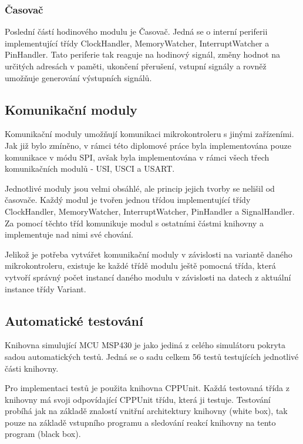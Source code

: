 \subsubsection{Časovač}

Poslední částí hodinového modulu je Časovač. Jedná se o interní periferii implementující třídy ClockHandler, MemoryWatcher, InterruptWatcher a PinHandler. Tato periferie tak reaguje na hodinový signál, změny hodnot na určitých adresách v paměti, ukončení přerušení, vstupní signály a rovněž umožňuje generování výstupních signálů.


\subsection{Komunikační moduly}

Komunikační moduly umožňují komunikaci mikrokontroleru s jinými zařízeními. Jak již bylo zmíněno, v rámci této diplomové práce byla implementována pouze komunikace v módu SPI, avšak byla implementována v rámci všech třech komunikačních modulů - USI, USCI a USART.

Jednotlivé moduly jsou velmi obsáhlé, ale princip jejich tvorby se nelišil od časovače. Každý modul je tvořen jednou třídou implementující třídy ClockHandler, MemoryWatcher, InterruptWatcher, PinHandler a SignalHandler. Za pomocí těchto tříd komunikuje modul s ostatními částmi knihovny a implementuje nad nimi své chování.

Jelikož je potřeba vytvářet komunikační moduly v závislosti na variantě daného mikrokontroleru, existuje ke každé třídě modulu ještě pomocná třída, která vytvoří správný počet instancí daného modulu v závislosti na datech z aktuální instance třídy Variant.

\subsection{Automatické testování}

Knihovna simulující MCU MSP430 je jako jediná z celého simulátoru pokryta sadou automatických testů. Jedná se o sadu celkem 56 testů testujících jednotlivé části knihovny.

Pro implementaci testů je použita knihovna CPPUnit. Každá testovaná třída z knihovny má svoji odpovídající CPPUnit třídu, která ji testuje. Testování probíhá jak na základě znalostí vnitřní architektury knihovny (white box), tak pouze na základě vstupního programu a sledování reakcí knihovny na tento program (black box).

